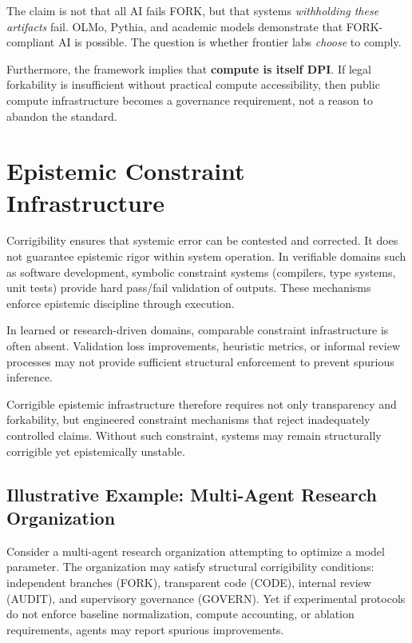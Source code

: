 \documentclass[11pt,a4paper]{article}
\theoremstyle{definition}
\begin{document}
The claim is not that all AI fails FORK, but that systems \textit{withholding these artifacts} fail. OLMo, Pythia, and academic models demonstrate that FORK-compliant AI is possible. The question is whether frontier labs \textit{choose} to comply.

Furthermore, the framework implies that \textbf{compute is itself DPI}. If legal forkability is insufficient without practical compute accessibility, then public compute infrastructure becomes a governance requirement, not a reason to abandon the standard.


\section{Epistemic Constraint Infrastructure}
\label{sec:epistemic-constraint}

Corrigibility ensures that systemic error can be contested and corrected. It does not guarantee epistemic rigor within system operation. In verifiable domains such as software development, symbolic constraint systems (compilers, type systems, unit tests) provide hard pass/fail validation of outputs. These mechanisms enforce epistemic discipline through execution.

In learned or research-driven domains, comparable constraint infrastructure is often absent. Validation loss improvements, heuristic metrics, or informal review processes may not provide sufficient structural enforcement to prevent spurious inference.

Corrigible epistemic infrastructure therefore requires not only transparency and forkability, but engineered constraint mechanisms that reject inadequately controlled claims. Without such constraint, systems may remain structurally corrigible yet epistemically unstable.

\subsection{Illustrative Example: Multi-Agent Research Organization}

Consider a multi-agent research organization attempting to optimize a model parameter. The organization may satisfy structural corrigibility conditions: independent branches (FORK), transparent code (CODE), internal review (AUDIT), and supervisory governance (GOVERN). Yet if experimental protocols do not enforce baseline normalization, compute accounting, or ablation requirements, agents may report spurious improvements.
\end{document}

